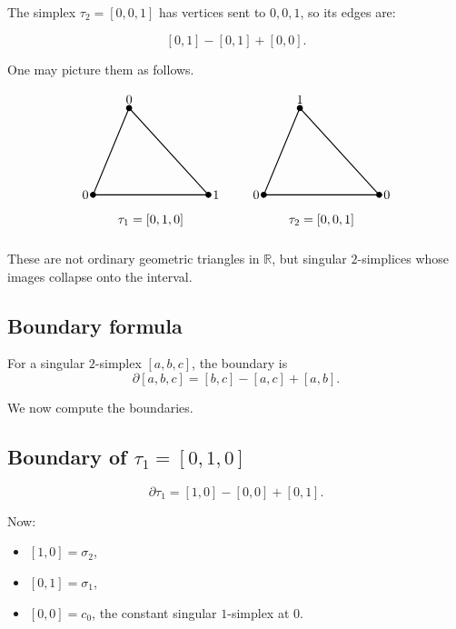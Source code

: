 \documentclass[12pt,a4paper]{article}
\theoremstyle{notespace}
\begin{document}
The simplex \(\tau_2=[0,0,1]\) has vertices sent to \(0,0,1\), so its edges are:

\[
[0,1]-[0,1]+[0,0].
\]

One may picture them as follows.

\[
\begin{tikzpicture}[scale=2]
	\coordinate (A) at (0,0);
	\coordinate (B) at (1.6,0);
	\coordinate (C) at (0.5,1.2);
	
	\fill (A) circle (1.2pt) node[left] {\(0\)};
	\fill (B) circle (1.2pt) node[right] {\(1\)};
	\fill (C) circle (1.2pt) node[above] {\(0\)};
	
	\draw[thick] (A)--(B)--(C)--cycle;
	\node at (0.8,-0.35) {\(\tau_1=[0,1,0]\)};
\end{tikzpicture}
\qquad
\begin{tikzpicture}[scale=2]
	\coordinate (A) at (0,0);
	\coordinate (B) at (1.6,0);
	\coordinate (C) at (0.5,1.2);
	
	\fill (A) circle (1.2pt) node[left] {\(0\)};
	\fill (B) circle (1.2pt) node[right] {\(0\)};
	\fill (C) circle (1.2pt) node[above] {\(1\)};
	
	\draw[thick] (A)--(B)--(C)--cycle;
	\node at (0.8,-0.35) {\(\tau_2=[0,0,1]\)};
\end{tikzpicture}
\]

These are not ordinary geometric triangles in \(\mathbb{R}\), but singular \(2\)-simplices whose images collapse onto the interval.

\subsection{Boundary formula}

For a singular \(2\)-simplex \([a,b,c]\), the boundary is
\[
\partial[a,b,c]=[b,c]-[a,c]+[a,b].
\]

We now compute the boundaries.

\subsection{Boundary of \(\tau_1=[0,1,0]\)}

\[
\partial\tau_1
=
[1,0]-[0,0]+[0,1].
\]

Now:

\begin{itemize}
	\item \([1,0]=\sigma_2\),
	\item \([0,1]=\sigma_1\),
	\item \([0,0]=c_0\), the constant singular \(1\)-simplex at \(0\).
\end{itemize}
\end{document}
